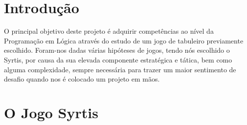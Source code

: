 \documentclass[a4paper]{article}
\begin{document}

\newpage

%
%
%
%
%
%
%


\section{Introdução}

O principal objetivo deste projeto é adquirir competências ao nível da Programação em Lógica através do estudo de um jogo de tabuleiro previamente escolhido. Foram-nos dadas várias hipóteses de jogos, tendo nós escolhido o Syrtis, por causa da sua elevada componente estratégica e tática, bem como alguma complexidade, sempre necessária para trazer um maior sentimento de desafio quando nos é colocado um projeto em mãos.

\section{O Jogo Syrtis}
\end{document}
